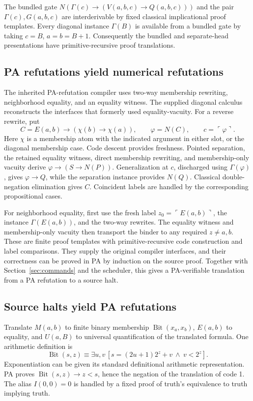 \documentclass[11pt]{article}
\begin{document}
The bundled gate
$N(\Gamma(c)\to(V(a,b,c)\to Q(a,b,c)))$ and the pair
$\Gamma(c),G(a,b,c)$ are interderivable by fixed classical implicational
proof templates. Every diagonal instance $\Gamma(B)$ is available from
a bundled gate by taking $c=B$, $a=b=B+1$. Consequently the bundled and
separate-head presentations have primitive-recursive proof translations.

\subsection{PA refutations yield numerical refutations}

The inherited PA-refutation compiler uses two-way membership rewriting,
neighborhood equality, and an equality witness. The supplied diagonal
calculus reconstructs the interfaces that formerly used
equality-vacuity. For a reverse rewrite, put
\[
C=E(a,b)\to(\chi(b)\to\chi(a)),\qquad
\varphi=N(C),\qquad c=\ulcorner\varphi\urcorner.
\]
Here $\chi$ is a membership atom with the indicated argument in either
slot, or the diagonal membership case. Code descent provides freshness.
Pointed separation, the retained equality witness, direct membership
rewriting, and membership-only vacuity derive
$\varphi\to(S\to N(P))$. Generalization at $c$, discharged using
$\Gamma(\varphi)$, gives $\varphi\to Q$, while the separation instance
provides $N(Q)$. Classical double-negation elimination gives $C$.
Coincident labels are handled by the corresponding propositional cases.

For neighborhood equality, first use the fresh label
$z_0=\ulcorner E(a,b)\urcorner$, the instance $\Gamma(E(a,b))$, and the
two-way rewrites. The equality witness and membership-only vacuity then
transport the binder to any required $z\ne a,b$. These are finite
proof templates with primitive-recursive code construction and label
comparisons. They supply the original compiler interfaces, and their
correctness can be proved in PA by induction on the source proof.
Together with Section~\ref{sec:commands} and the scheduler, this gives a
PA-verifiable translation from a PA refutation to a source halt.

\subsection{Source halts yield PA refutations}

Translate $M(a,b)$ to finite binary membership
$\operatorname{Bit}(x_a,x_b)$, $E(a,b)$ to equality, and $U(a,B)$ to
universal quantification of the translated formula. One arithmetic
definition is
\[
\operatorname{Bit}(s,z)\equiv
\exists u,v\,[s=(2u+1)2^z+v\ \wedge\ v<2^z].
\]
Exponentiation can be given its standard definitional arithmetic
representation. PA proves $\operatorname{Bit}(s,z)\to z<s$, hence the
negation of the translation of code 1. The alias $I(0,0)=0$ is handled by
a fixed proof of truth's equivalence to truth implying truth.
\end{document}

